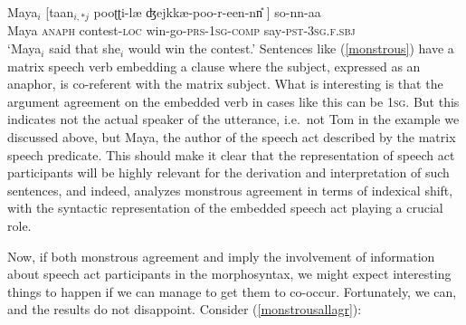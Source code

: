 \documentclass[output=paper, modfonts, nonflat]{langsci/langscibook}
\begin{document}
\ea
  \label{monstrous}\gll Maya$_i$ [taan$_{i,*j}$ pooʈʈi-læ{} ʤejkkæ-poo-r-een-nn\U{} ] so-nn-aa\\
  Maya \textsc{anaph} contest-\textsc{loc}{}  win-go-\textsc{prs}-\textsc{1sg}-\textsc{comp}{}  {} say-\textsc{pst}-\textsc{3sg.f}.\textsc{sbj}\\
  \glt `Maya$_i$ said that she$_i$ would win the contest.'
\z 
%
Sentences like (\ref{monstrous}) have a matrix speech verb embedding a
clause where the subject, expressed as an anaphor, is co-referent with
the matrix subject.  What is interesting is that the argument
agreement on the embedded verb in cases like this can be
\textsc{1sg}. But this indicates not the actual speaker of the
utterance, i.e.\ not Tom in the example we discussed above, but Maya,
the author of the speech act described by the matrix speech
predicate. This should make it clear that the representation of speech
act participants will be highly relevant for the derivation and
interpretation of such sentences, and indeed, \citet{sundaresan:diss}
analyzes monstrous agreement in terms of indexical shift, with the
syntactic representation of the embedded speech act playing a crucial
role.

Now, if both monstrous agreement and \allagr{} imply the involvement
of information about speech act participants in the morphosyntax, we
might expect interesting things to happen if we can manage to get them
to co-occur. Fortunately, we can, and the results do not
disappoint. Consider (\ref{monstrousallagr}):
\end{document}
